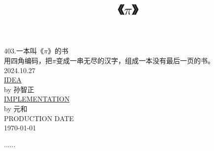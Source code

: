 \documentclass[12pt, oneside]{book}
\title{《$\pi$》}
\author{}
\date{}
\begin{document}
	\maketitle
	
	{\centering
		\quad
		\vspace{4em}
		
		403.一本叫《$\pi$》的书 \\
		用四角编码，把$\pi$变成一串无尽的汉字，组成一本没有最后一页的书。\\
		2024.10.27 \\
		
		\vspace{1em}
		\href{https://mp.weixin.qq.com/s/LyUCRKytMIxOkjeeRd1OYg}{IDEA} \\ 
		by 孙智正 \\ 
		
		\vspace{2em}
		\href{https://github.com/yuanhes/4CornerIndex-to-Text}{IMPLEMENTATION} \\
		by 元和 \\ 
		
		\vspace{3em}
		PRODUCTION DATE \\
		\today
		
	}
	
	
	\mainmatter
	
	\setcounter{page}{1} %
	
	
	
	......
	
\end{document}
